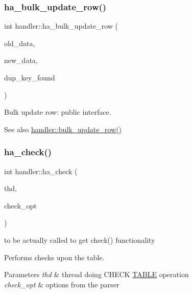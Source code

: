 \subsubsection{\texorpdfstring{ha\+\_\+bulk\+\_\+update\+\_\+row()}{ha\_bulk\_update\_row()}}
{\footnotesize\ttfamily int handler\+::ha\+\_\+bulk\+\_\+update\+\_\+row (\begin{DoxyParamCaption}\item[{const uchar $\ast$}]{old\+\_\+data,  }\item[{uchar $\ast$}]{new\+\_\+data,  }\item[{uint $\ast$}]{dup\+\_\+key\+\_\+found }\end{DoxyParamCaption})}

Bulk update row\+: public interface.

\begin{DoxySeeAlso}{See also}
\mbox{\hyperlink{classhandler_ac8dd7e44bc71120ace1e467ccb02ad06}{handler\+::bulk\+\_\+update\+\_\+row()}} 
\end{DoxySeeAlso}
\mbox{\label{classhandler_a56545ec9967544c80d5612f8ac9b8e6e}} 
\subsubsection{\texorpdfstring{ha\+\_\+check()}{ha\_check()}}
{\footnotesize\ttfamily int handler\+::ha\+\_\+check (\begin{DoxyParamCaption}\item[{T\+HD $\ast$}]{thd,  }\item[{\mbox{\hyperlink{structst__ha__check__opt}{H\+A\+\_\+\+C\+H\+E\+C\+K\+\_\+\+O\+PT}} $\ast$}]{check\+\_\+opt }\end{DoxyParamCaption})}

to be actually called to get \textquotesingle{}check()\textquotesingle{} functionality

Performs checks upon the table.


\begin{DoxyParams}{Parameters}
{\em thd} & thread doing C\+H\+E\+CK \mbox{\hyperlink{structTABLE}{T\+A\+B\+LE}} operation \\
\hline
{\em check\+\_\+opt} & options from the parser\\
\hline
\end{DoxyParams}


